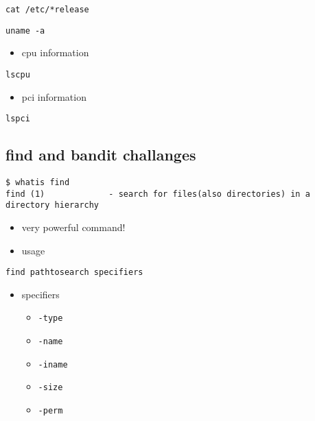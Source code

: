 \documentclass[
]{article}
\providecommand{\tightlist}{%
  \setlength{\itemsep}{0pt}\setlength{\parskip}{0pt}}
\begin{document}
\begin{verbatim}
cat /etc/*release
\end{verbatim}

\begin{verbatim}
uname -a
\end{verbatim}

\begin{itemize}
\tightlist
\item
  cpu information
\end{itemize}

\begin{verbatim}
lscpu
\end{verbatim}

\begin{itemize}
\tightlist
\item
  pci information
\end{itemize}

\begin{verbatim}
lspci
\end{verbatim}

\hypertarget{find-and-bandit-challanges}{%
\subsection{find and bandit
challanges}\label{find-and-bandit-challanges}}

\begin{verbatim}
$ whatis find    
find (1)             - search for files(also directories) in a directory hierarchy
\end{verbatim}

\begin{itemize}
\item
  very powerful command!
\item
  usage
\end{itemize}

\begin{verbatim}
find pathtosearch specifiers
\end{verbatim}

\begin{itemize}
\tightlist
\item
  specifiers

  \begin{itemize}
  \tightlist
  \item
    \texttt{-type}
  \item
    \texttt{-name}
  \item
    \texttt{-iname}
  \item
    \texttt{-size}
  \item
    \texttt{-perm}
  \end{itemize}
\end{itemize}
\end{document}
